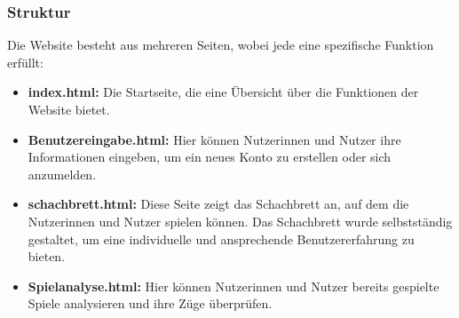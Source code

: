 \subsubsection{Struktur}
Die Website besteht aus mehreren Seiten, wobei jede eine spezifische Funktion erfüllt:
\begin{itemize}
    \item \textbf{index.html:} Die Startseite, die eine Übersicht über die Funktionen der 
    Website bietet.
    \item \textbf{Benutzereingabe.html:} Hier können Nutzerinnen und Nutzer ihre Informationen 
    eingeben, um ein neues Konto zu erstellen oder sich anzumelden.
    \item \textbf{schachbrett.html:} Diese Seite zeigt das Schachbrett an, auf dem die 
    Nutzerinnen und Nutzer spielen können. Das Schachbrett wurde selbstständig gestaltet, 
    um eine individuelle und ansprechende Benutzererfahrung zu bieten.
    \item \textbf{Spielanalyse.html:} Hier können Nutzerinnen und Nutzer bereits gespielte 
    Spiele analysieren und ihre Züge überprüfen.
\end{itemize}


